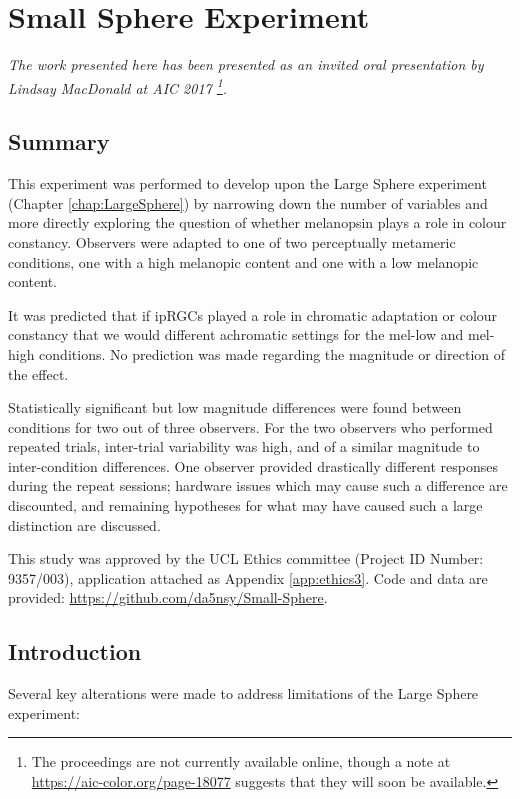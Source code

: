 \chapter{Small Sphere Experiment}
\label{chap:SmallSphere}

\textit{The work presented here has been presented as an invited oral presentation by Lindsay MacDonald at AIC 2017 \citep{macdonald_melanopsin_2017}\footnote{The proceedings are not currently available online, though a note at \url{https://aic-color.org/page-18077} suggests that they will soon be available.}.}


\section{Summary}

This experiment was performed to develop upon the Large Sphere experiment (Chapter \ref{chap:LargeSphere}) by narrowing down the number of variables and more directly exploring the question of whether melanopsin plays a role in colour constancy. Observers were adapted to one of two perceptually metameric conditions, one with a high melanopic content and one with a low melanopic content.

It was predicted that if \glspl{ipRGC} played a role in chromatic adaptation or colour constancy that we would different achromatic settings for the mel-low and mel-high conditions. No prediction was made regarding the magnitude or direction of the effect.

Statistically significant but low magnitude differences were found between conditions for two out of three observers. For the two observers who performed repeated trials, inter-trial variability was high, and of a similar magnitude to inter-condition differences. One observer provided drastically different responses during the repeat sessions; hardware issues which may cause such a difference are discounted, and remaining hypotheses for what may have caused such a large distinction are discussed. 

This study was approved by the \gls{UCL} Ethics committee (Project ID Number: 9357/003), application attached as Appendix \ref{app:ethics3}. Code and data are provided: \url{https://github.com/da5nsy/Small-Sphere}.

\section{Introduction}

Several key alterations were made to address limitations of the Large Sphere experiment:

